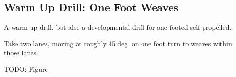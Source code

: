 \subsection*{Warm Up Drill: One Foot Weaves} 

A warm up drill, but also a developmental drill for one footed self-propelled.

Take two lanes, moving at roughly 45$\deg$ on one foot turn to weaves within those lanes.    

{\color{red} TODO: Figure}

